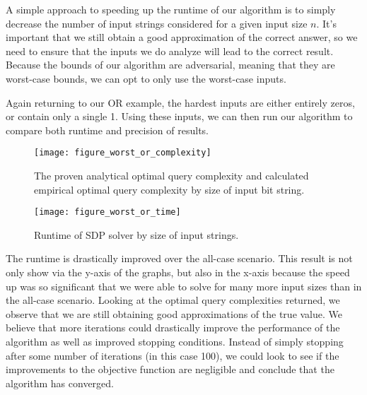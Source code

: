 A simple approach to speeding up the runtime of our
algorithm is to simply decrease the number of input
strings considered for a given input size $n$. It's
important that we still obtain a good approximation
of the correct answer, so we need to ensure that the
inputs we do analyze will lead to the correct result.
Because the bounds of our algorithm are adversarial,
meaning that they are worst-case bounds, we can opt
to only use the worst-case inputs.

Again returning to our OR example, the hardest inputs are
either entirely zeros, or contain only a single 1. 
Using these inputs, we can then run our algorithm to 
compare both runtime and precision of results.

\begin{figure}[ht]
\centering
\texttt{[image: figure\_worst\_or\_complexity]}
\caption{The proven analytical optimal query complexity
and calculated empirical optimal query complexity by 
size of input bit string.}
\label{fig:or_worst_complexity}
\end{figure}

\begin{figure}[ht]
\centering
\texttt{[image: figure\_worst\_or\_time]}
\caption{Runtime of SDP solver by size of input strings.}
\label{fig:or_worst_runtime}
\end{figure}

The runtime is drastically improved over the all-case scenario. 
This result is not only show via the y-axis of the graphs, 
but also in the x-axis because the speed up was so 
significant that we were able to solve for many more 
input sizes than in the all-case scenario. 
Looking at the optimal query complexities returned, 
we observe that we are still obtaining good 
approximations of the true value. 
We believe that more iterations could drastically 
improve the performance of the algorithm as well as 
improved stopping conditions. Instead of simply stopping 
after some number of iterations (in this case 100), 
we could look to see if the improvements to the objective 
function are negligible and conclude that the algorithm has converged.
